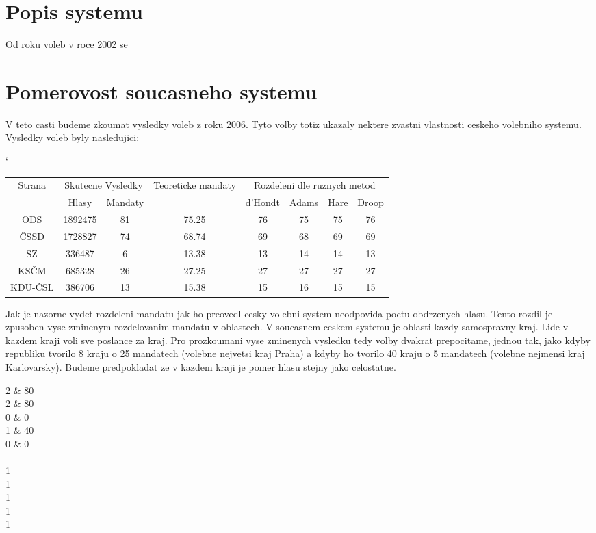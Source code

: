 \documentclass[12pt,a4paper]{report}
\begin{document}
\section{Popis systemu}
Od roku voleb v roce 2002 se 

\section{Pomerovost soucasneho systemu}
V teto casti budeme zkoumat vysledky voleb z roku 2006. 
Tyto volby totiz ukazaly nektere zvastni vlastnosti ceskeho volebniho systemu.
Vysledky voleb byly nasledujici:

\begin{center}
\catcode`
\begin{tabular}{|c|c|c|c|c|c|c|c|}
\hline
\multirow{2}{*}{Strana}  & \multicolumn{2}{|c|}{Skutecne Vysledky} & \multirow{2}{*}{Teoreticke mandaty} & \multicolumn{4}{|c|}{Rozdeleni dle ruznych metod} \\ \cline{2-3} \cline{5-8}
& Hlasy & Mandaty & & d'Hondt & Adams & Hare & Droop \\  
\hline
ODS & 1892475 & 81 & 75.25 & 76 & 75 & 75 & 76 \\ 
\hline
ČSSD & 1728827 & 74 & 68.74 & 69 & 68 & 69 & 69 \\ 
\hline
SZ & 336487 & 6 & 13.38 & 13 & 14 & 14 & 13 \\ 
\hline
KSČM & 685328 & 26 & 27.25 & 27 & 27 & 27 & 27 \\ 
\hline
KDU-ČSL & 386706 & 13 & 15.38 & 15 & 16 & 15 & 15 \\ 
\hline
\end{tabular} 
\end{center}
Jak je nazorne vydet rozdeleni mandatu jak ho preovedl cesky volebni system neodpovida poctu obdrzenych hlasu.
Tento rozdil je zpusoben vyse zminenym rozdelovanim mandatu v oblastech.
V soucasnem ceskem systemu je oblasti kazdy samospravny kraj.
Lide v kazdem kraji voli sve poslance za kraj.
Pro prozkoumani vyse zminenych vysledku tedy volby dvakrat prepocitame, jednou tak, jako kdyby republiku tvorilo 8 kraju o 25 mandatech (volebne nejvetsi kraj Praha) a kdyby ho tvorilo 40 kraju o 5 mandatech (volebne nejmensi kraj Karlovarsky).
Budeme predpokladat ze v kazdem kraji je pomer hlasu stejny jako celostatne.



2 \& 80\\
2 \& 80\\
0 \& 0\\
1 \& 40\\
0 \& 0\\
\\
1\\
1\\
1\\
1\\
1\\
\end{document}
